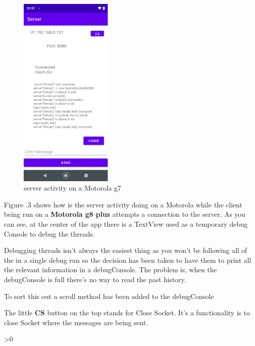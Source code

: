 \documentclass[a4paper,12pt]{article}
\makeatletter
\newcommand{\wrapfill}{\par\ifnum\value{WF@wrappedlines}>0
  \addtocounter{WF@wrappedlines}{-1}%
  \null\vspace{\arabic{WF@wrappedlines}\baselineskip}%
  \WFclear
\fi}
\makeatother
\begin{document}
\clearpage


\begin{figure}
\centering
\includegraphics[width=4.5cm]{./server_g7.PNG}
\caption{server activity on a Motorola g7}\label{wrap-fig:3}
\end{figure}
Figure .3 shows how is the server activity doing on a Motorola while the client\footnotemark{} being run on a \textbf{Motorola g8 plus} attempts a connection to the server. As you can see, at the center of the app there is a TextView used as a temporary debug Console to debug the threads.

Debugging threads isn't always the easiest thing as you won't be following all of the in a single debug run so the decision has been taken to have them to print all the relevant information in a debugConsole. The problem is, when the debugConsole is full there's no way to read the past history.

To sort this out a scroll method has been added to the debugConsole

The little \textbf{CS} button on the top stands for Close Socket. It's a functionality is to close Socket where the messages are being sent.

\wrapfill
\end{document}
